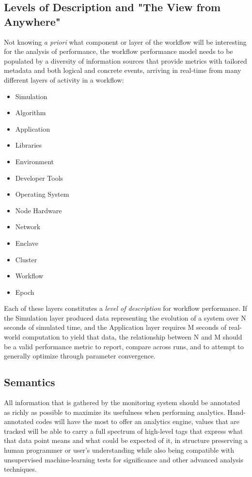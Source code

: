 \subsection{Levels of Description and "The View from Anywhere"}
Not knowing \textit{a priori} what component or layer of the workflow
will be interesting for the analysis of performance, the workflow
performance model needs to be populated by a diversity of information
sources that provide metrics with tailored metadata and both logical
and concrete events, arriving in real-time from many different layers
of activity in a workflow:
\begin{itemize}
    \item Simulation
    \item Algorithm
    \item Application
    \item Libraries
    \item Environment
    \item Developer Tools
    \item Operating System
    \item Node Hardware
    \item Network
    \item Enclave
    \item Cluster
    \item Workflow
    \item Epoch	
\end{itemize}

Each of these layers constitutes a \textit{level of description} for
workflow performance. If the Simulation layer produced data
representing the evolution of a system over N seconds of simulated
time, and the Application layer requires M seconds of real-world
computation to yield that data, the relationship between N and M
should be a valid performance metric to report, compare across runs,
and to attempt to generally optimize through parameter convergence.

\subsection{Semantics}
All information that is gathered by the monitoring system should be
annotated as richly as possible to maximize its usefulness when
performing analytics.  Hand-annotated codes will have the most to
offer an analytics engine, values that are tracked will be able to
carry a full spectrum of high-level tags that express what that data
point means and what could be expected of it, in structure preserving
a human programmer or user's understanding while also being compatible
with unsupervised machine-learning tests for significance and other
advanced analysis techniques.


